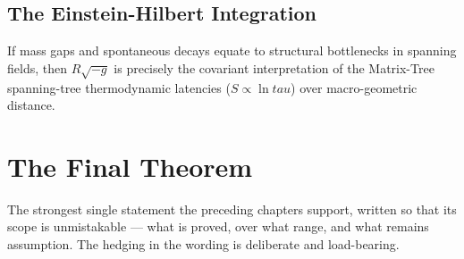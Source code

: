 \documentclass[12pt,a4paper]{article}
\def\tau{tau}%
\theoremstyle{definition}
\begin{document}
\subsection{The Einstein-Hilbert Integration}
If mass gaps and spontaneous decays equate to structural bottlenecks in spanning fields, then $R\sqrt{-g}$ is precisely the covariant interpretation of the Matrix-Tree spanning-tree thermodynamic latencies ($S \propto \ln \tau$) over macro-geometric distance.


\section{The Final Theorem}

\begin{plainbox}
The strongest single statement the preceding chapters support, written so that its
scope is unmistakable --- what is proved, over what range, and what remains assumption. The
hedging in the wording is deliberate and load-bearing.
\end{plainbox}

\label{sec:final}
\end{document}
